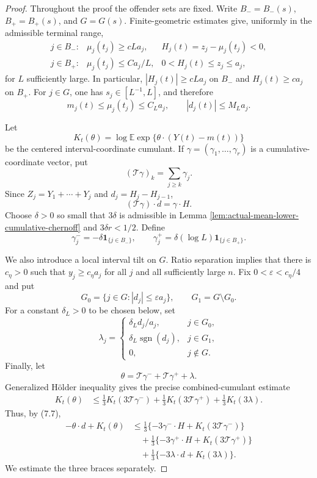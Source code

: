 \documentclass[11pt]{article}
\theoremstyle{remark}
\newcommand{\Ee}{\mathbb E}
\newcommand{\one}{\mathbf 1}
\begin{document}
\begin{proof}
Throughout the proof the offender sets are fixed.  Write $B_-=B_-(s)$,
$B_+=B_+(s)$, and $G=G(s)$.  Finite-geometric estimates give, uniformly in
the admissible terminal range,
\[
\begin{array}{lll}
 j\in B_-:& \mu_j(t_j)\ge cLa_j,& H_j(t)=z_j-\mu_j(t_j)<0,\\[2mm]
 j\in B_+:& \mu_j(t_j)\le Ca_j/L,& 0<H_j(t)\le z_j\le a_j,
\end{array}
\tag{7.5}
\]
for $L$ sufficiently large.  In particular,
$|H_j(t)|\ge cLa_j$ on $B_-$ and $H_j(t)\ge ca_j$ on $B_+$.
For $j\in G$, one has $s_j\in[L^{-1},L]$, and therefore
\[
        m_j(t)\le\mu_j(t_j)\le C_La_j,
        \qquad |d_j(t)|\le M_La_j.
        \tag{7.6}
\]

Let
\[
        K_t(\theta)=\log\Ee\exp\{\theta\cdot(Y(t)-m(t))\}
\]
be the centered interval-coordinate cumulant.  If
$\gamma=(\gamma_1,\ldots,\gamma_r)$ is a cumulative-coordinate vector, put
\[
        (\mathcal T\gamma)_k=\sum_{j\ge k}\gamma_j.
\]
Since $Z_j=Y_1+\cdots+Y_j$ and $d_j=H_j-H_{j-1}$,
\[
        (\mathcal T\gamma)\cdot d=\gamma\cdot H.
        \tag{7.7}
\]
Choose $\delta>0$ so small that $3\delta$ is admissible in Lemma
\ref{lem:actual-mean-lower-cumulative-chernoff} and
$3\delta r<1/2$.  Define
\[
        \gamma_j^-=-\delta\one_{\{j\in B_-\}},
        \qquad
        \gamma_j^+=\delta(\log L)\one_{\{j\in B_+\}}.
\]

We also introduce a local interval tilt on $G$.  Ratio separation implies that
there is $c_\eta>0$ such that $y_j\ge c_\eta a_j$ for all $j$ and all
sufficiently large $n$.  Fix $0<\varepsilon<c_\eta/4$ and put
\[
        G_0=\{j\in G:|d_j|\le\varepsilon a_j\},
        \qquad G_1=G\setminus G_0.
\]
For a constant $\delta_L>0$ to be chosen below, set
\[
        \lambda_j=
        \begin{cases}
        \delta_L d_j/a_j,&j\in G_0,\\
        \delta_L\operatorname{sgn}(d_j),&j\in G_1,\\
        0,&j\notin G.
        \end{cases}
\]
Finally, let
\[
        \theta=\mathcal T\gamma^-+\mathcal T\gamma^++\lambda.
\]
Generalized H\"older inequality gives the precise combined-cumulant estimate
\[
\begin{aligned}
        K_t(\theta)
        &\le\frac13K_t(3\mathcal T\gamma^-)
             +\frac13K_t(3\mathcal T\gamma^+)
             +\frac13K_t(3\lambda).
\end{aligned}\tag{7.8}
\]
Thus, by (7.7),
\[
\begin{aligned}
-\theta\cdot d+K_t(\theta)
&\le\frac13\{-3\gamma^-\cdot H+K_t(3\mathcal T\gamma^-)\}\\
&\quad+\frac13\{-3\gamma^+\cdot H+K_t(3\mathcal T\gamma^+)\}\\
&\quad+\frac13\{-3\lambda\cdot d+K_t(3\lambda)\}.
\end{aligned}\tag{7.9}
\]
We estimate the three braces separately.


\end{proof}
\end{document}
